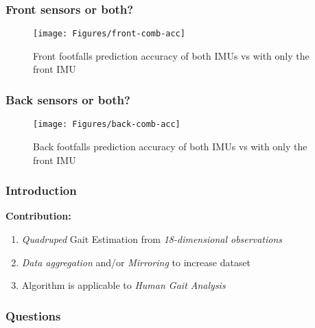 \documentclass[serif,mathserif]{beamer}
\begin{document}
\begin{frame}
	\frametitle{Front sensors or both?}
	\begin{figure}[t]
		\texttt{[image: Figures/front-comb-acc]}
		\caption{Front footfalls prediction accuracy of both IMUs vs with only the front IMU}
	\end{figure}
\end{frame}

\begin{frame}
	\frametitle{Back sensors or both?}
	\begin{figure}[t]
		\texttt{[image: Figures/back-comb-acc]}
		\caption{Back footfalls prediction accuracy of both IMUs vs with only the front IMU}
	\end{figure}
\end{frame}



\begin{frame}
	\frametitle{Introduction}
	\textbf{Contribution:}\pause
	\newline
	\begin{enumerate}		
		\item \textit{Quadruped} Gait Estimation from \textit{18-dimensional observations} \pause
		\newline
		\newline
		\item \textit{Data aggregation} and/or \textit{Mirroring} to increase dataset \pause
		\newline
		\newline
		\item Algorithm is applicable to \textit{Human Gait Analysis}
	\end{enumerate}
\end{frame}

\begin{frame}
  \frametitle{Questions}
\end{frame}
\end{document}
